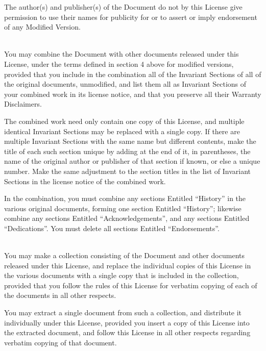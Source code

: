 The author(s) and publisher(s) of the Document do not by this License give permission to use their names for publicity for or to assert or imply endorsement of any Modified Version.


\bigskip{}\\

\noindent
You may combine the Document with other documents released under this License, under the terms defined in section 4 above for modified versions, provided that you include in the combination all of the Invariant Sections of all of the original documents, unmodified, and list them all as Invariant Sections of your combined work in its license notice, and that you preserve all their Warranty Disclaimers.

The combined work need only contain one copy of this License, and multiple identical Invariant Sections may be replaced with a single copy.  If there are multiple Invariant Sections with the same name but different contents, make the title of each such section unique by adding at the end of it, in parentheses, the name of the original author or publisher of that section if known, or else a unique number. Make the same adjustment to the section titles in the list of Invariant Sections in the license notice of the combined work. 

In the combination, you must combine any sections Entitled "`History"' in the various original documents, forming one section Entitled "`History"'; likewise combine any sections Entitled "`Acknowledgements"', and any sections Entitled "`Dedications"'.  You must delete all sections Entitled "`Endorsements"'.


\bigskip{}\\

\noindent
You may make a collection consisting of the Document and other documents released under this License, and replace the individual copies of this License in the various documents with a single copy that is included in the collection, provided that you follow the rules of this License for verbatim copying of each of the documents in all other respects.

You may extract a single document from such a collection, and distribute it individually under this License, provided you insert a copy of this License into the extracted document, and follow this License in all other respects regarding verbatim copying of that document.


